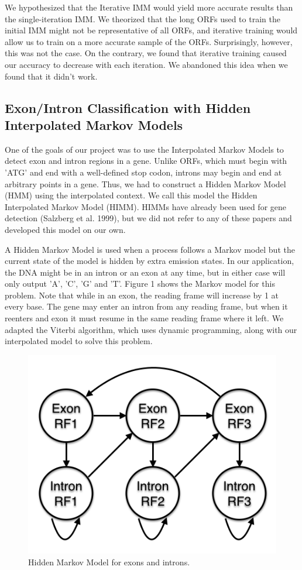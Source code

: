 \documentclass[11pt,letterpaper]{article}
\begin{document}
We hypothesized that the Iterative IMM would yield more accurate results than the single-iteration IMM. We theorized that the long ORFs used to train the initial IMM might not be representative of all ORFs, and iterative training would allow us to train on a more accurate sample of the ORFs. Surprisingly, however, this was not the case. On the contrary, we found that iterative training caused our accuracy to decrease with each iteration. We abandoned this idea when we found that it didn't work.


\subsection{Exon/Intron Classification with Hidden Interpolated Markov Models}
One of the goals of our project was to use the Interpolated Markov Models to detect exon and intron regions in a gene. Unlike ORFs, which must begin with 'ATG' and end with a well-defined stop codon, introns may begin and end at arbitrary points in a gene. Thus, we had to construct a Hidden Markov Model (HMM) using the interpolated context. We call this model the Hidden Interpolated Markov Model (HIMM). HIMMs have already been used for gene detection (Salzberg et al. 1999), but we did not refer to any of these papers and developed this model on our own.

A Hidden Markov Model is used when a process follows a Markov model but the current state of the model is hidden by extra emission states. In our application, the DNA might be in an intron or an exon at any time, but in either case will only output 'A', 'C', 'G' and 'T'. Figure 1 shows the Markov model for this problem. Note that while in an exon, the reading frame will increase by 1 at every base. The gene may enter an intron from any reading frame, but when it reenters and exon it must resume in the same reading frame where it left. We adapted the Viterbi algorithm, which uses dynamic programming, along with our interpolated model to solve this problem.

\begin{figure}
	\begin{center}
		\includegraphics[scale=0.4]{HMM.png}
	\end{center}
	\caption{\label{font-table} Hidden Markov Model for exons and introns.}
\end{figure}
\end{document}
